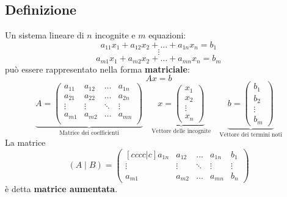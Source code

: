 \documentclass[a4paper]{article}
\theoremstyle{break}
\theoremstyle{break}
\theoremstyle{break}
\theoremstyle{break}
\begin{document}
\subsection{Definizione}
Un sistema lineare di \( n \) incognite e \( m \) equazioni:
\[
	a_{11}x_1 + a_{12}x_2 + \ldots + a_{1n}x_n = b_1
\]
\[
	\vdots
\]
\[
	a_{m1}x_1 + a_{m2}x_2 + \ldots + a_{mn}x_n = b_m
\]
può essere rappresentato nella forma \textbf{matriciale}:
\[
	Ax = b
\]
\[
	\underbrace{
		A = \begin{pmatrix}
			a_{11} & a_{12} & \ldots & a_{1n} \\
			a_{21} & a_{22} & \ldots & a_{2n} \\
			\vdots & \vdots & \ddots & \vdots \\
			a_{m1} & a_{m2} & \ldots & a_{mn} \\
		\end{pmatrix}}_{\text{Matrice dei coefficienti}} \quad \underbrace{x = \begin{pmatrix}
			x_1    \\
			x_2    \\
			\vdots \\
			x_n
		\end{pmatrix}}_{\text{Vettore delle incognite}} \quad \underbrace{b = \begin{pmatrix}
			b_1    \\
			b_2    \\
			\vdots \\
			b_m
		\end{pmatrix}}_{\text{Vettore dei termini noti}}
\]
La matrice \[ (A \;|\; B) = \begin{pmatrix}[cccc|c]
		a_{1n} & a_{12} & \ldots & a_{1n} & b_1    \\
		\vdots & \vdots & \ddots & \vdots & \vdots \\
		a_{m1} & a_{m2} & \ldots & a_{mn} & b_n
	\end{pmatrix}  \] è detta \textbf{matrice aumentata}.
\end{document}
